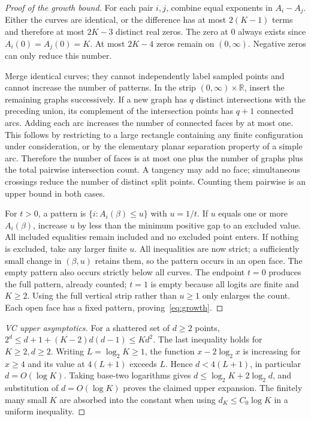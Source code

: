 \documentclass[10pt]{article}
\theoremstyle{definition}\newtheorem{definition}[theorem]{Definition}
\theoremstyle{remark}\newtheorem{remark}[theorem]{Remark}
\newcommand{\R}{\mathbb R}
\newcommand{\1}{\mathbf 1}
\begin{document}
\begin{proof}[Proof of the growth bound]
For each pair $i,j$, combine equal exponents in $A_i-A_j$. Either the curves are identical, or the difference has at most $2(K-1)$ terms and therefore at most $2K-3$ distinct real zeros. The zero at $0$ always exists since $A_i(0)=A_j(0)=K$. At most $2K-4$ zeros remain on $(0,\infty)$. Negative zeros can only reduce this number.

Merge identical curves; they cannot independently label sampled points and cannot increase the number of patterns. In the strip $(0,\infty)\times\R$, insert the remaining graphs successively. If a new graph has $q$ distinct intersections with the preceding union, its complement of the intersection points has $q+1$ connected arcs. Adding each arc increases the number of connected faces by at most one. This follows by restricting to a large rectangle containing any finite configuration under consideration, or by the elementary planar separation property of a simple arc. Therefore the number of faces is at most one plus the number of graphs plus the total pairwise intersection count. A tangency may add no face; simultaneous crossings reduce the number of distinct split points. Counting them pairwise is an upper bound in both cases.

For $t>0$, a pattern is $\{i:A_i(\beta)\le u\}$ with $u=1/t$. If $u$ equals one or more $A_i(\beta)$, increase $u$ by less than the minimum positive gap to an excluded value. All included equalities remain included and no excluded point enters. If nothing is excluded, take any larger finite $u$. All inequalities are now strict; a sufficiently small change in $(\beta,u)$ retains them, so the pattern occurs in an open face. The empty pattern also occurs strictly below all curves. The endpoint $t=0$ produces the full pattern, already counted; $t=1$ is empty because all logits are finite and $K\ge2$. Using the full vertical strip rather than $u\ge1$ only enlarges the count. Each open face has a fixed pattern, proving~\eqref{eq:growth}.
\end{proof}

\begin{proof}[VC upper asymptotics]
For a shattered set of $d\ge2$ points, $2^d\le d+1+(K-2)d(d-1)\le Kd^2$. The last inequality holds for $K\ge2,d\ge2$. Writing $L=\log_2K\ge1$, the function $x-2\log_2x$ is increasing for $x\ge4$ and its value at $4(L+1)$ exceeds $L$. Hence $d<4(L+1)$, in particular $d=O(\log K)$. Taking base-two logarithms gives $d\le\log_2K+2\log_2 d$, and substitution of $d=O(\log K)$ proves the claimed upper expansion. The finitely many small $K$ are absorbed into the constant when using $d_K\le C_0\log K$ in a uniform inequality.
\end{proof}
\end{document}
